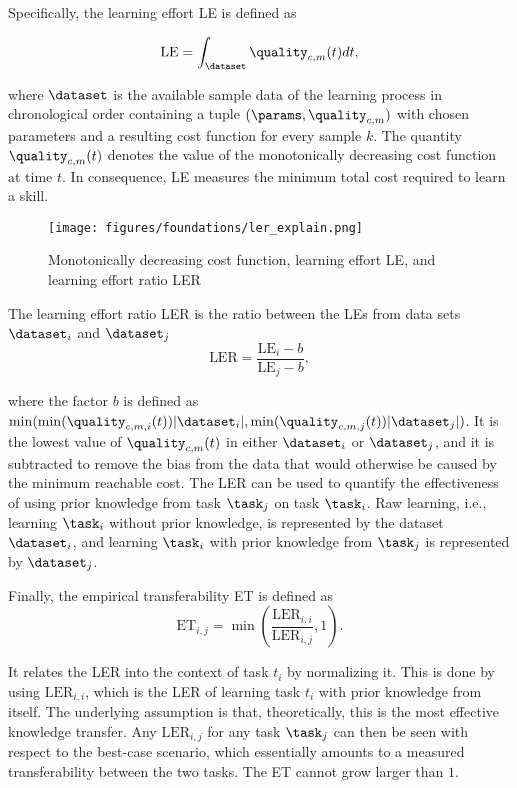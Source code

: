 Specifically, the learning effort LE is defined as

\begin{equation}
    \text{LE}=\int_\dataset \quality_{c,m}(t) dt
    ,
\end{equation}

where $\dataset$ is the available sample data of the learning process in chronological order containing a tuple $(\params,\quality_{c,m})$ with chosen parameters and a resulting cost function for every sample $k$.
The quantity $\quality_{c,m}(t)$ denotes the value of the monotonically decreasing cost function at time $t$.
In consequence, LE measures the minimum total cost required to learn a skill.

\begin{figure}[ht!]
    \centering
    \texttt{[image: figures/foundations/ler\_explain.png]}
    \caption{Monotonically decreasing cost function, learning effort LE, and learning effort ratio LER}
    \label{fig:foundations:learning:metrics}
\end{figure}

The learning effort ratio LER is the ratio between the LEs from data sets $\dataset_i$ and $\dataset_j$
\begin{equation}
    \text{LER}=\frac{\text{LE}_i-b}{\text{LE}_j-b}
    ,
\end{equation}

where the factor $b$ is defined as $\min(\min(\quality_{c,m,i}(t))|\dataset_i|,\min(\quality_{c,m,j}(t))|\dataset_j|)$.
It is the lowest value of $\quality_{c,m}(t)$ in either $\dataset_i$ or $\dataset_j$, and it is subtracted to remove the bias from the data that would otherwise be caused by the minimum reachable cost.
The LER can be used to quantify the effectiveness of using prior knowledge from task $\task_j$ on task $\task_i$.
Raw learning, i.e., learning $\task_i$ without prior knowledge, is represented by the dataset $\dataset_i$, and learning $\task_i$ with prior knowledge from $\task_j$ is represented by $\dataset_j$.

Finally, the empirical transferability ET is defined as
\begin{equation}
    \text{ET}_{i,j}=\min\left(\frac{\text{LER}_{i,i}}{\text{LER}_{i,j}},1 \right)
    .
\end{equation}

It relates the LER into the context of task $t_i$ by normalizing it.
This is done by using $\text{LER}_{i,i}$, which is the LER of learning task $t_i$ with prior knowledge from itself.
The underlying assumption is that, theoretically, this is the most effective knowledge transfer.
Any $\text{LER}_{i,j}$ for any task $\task_j$ can then be seen with respect to the best-case scenario, which essentially amounts to a measured transferability between the two tasks.
The ET cannot grow larger than $1$.

